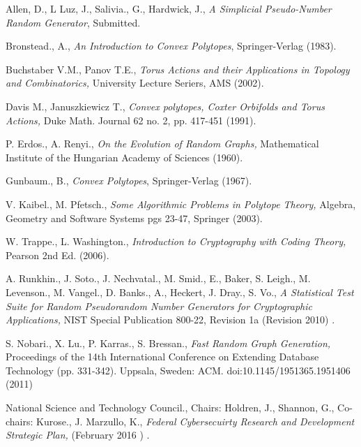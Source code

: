 \documentclass[oneside,12pt]{amsart}
\theoremstyle{definition}
\numberwithin{equation}{section}
\begin{document}
\clearpage
\begin{thebibliography}{14}


 Allen, D., L Luz, J., Salivia., G., Hardwick, J.,
{\emph{A Simplicial Pseudo-Number Random Generator}},
Submitted.


 Bronstead., A.,
{\emph{An Introduction to Convex Polytopes}},
Springer-Verlag (1983).


 Buchstaber V.M., Panov T.E.,
 {\textit{Torus Actions and their Applications in Topology and Combinatorics,}}
 University Lecture Seriers, AMS (2002).



 Davis M., Januszkiewicz T.,
{\em{Convex polytopes, Coxter Orbifolds and Torus Actions,}} Duke
Math. Journal 62 no. 2, pp. 417-451 (1991).


 P. Erdos., A. Renyi.,
 {\textit{On the Evolution of Random Graphs,}}
 Mathematical Institute of the Hungarian Academy of Sciences (1960).

 Gunbaum., B.,
{\emph{Convex Polytopes}},
Springer-Verlag (1967).

 V. Kaibel., M. Pfetsch.,
 {\textit{Some Algorithmic Problems in Polytope Theory,}}
 Algebra, Geometry and Software Systems pgs 23-47, Springer (2003).



 W. Trappe., L. Washington.,
 {\textit{Introduction to Cryptography with Coding Theory,}}
 Pearson 2nd Ed. (2006).






 A. Runkhin., J. Soto., J. Nechvatal., M. Smid., E., Baker, S. Leigh., M. Levenson., M. Vangel.,
D. Banks., A., Heckert, J. Dray., S. Vo.,
 {\textit{A Statistical Test Suite for Random Pseudorandom Number Generators for Cryptographic Applications,}}
 NIST Special Publication 800-22, Revision 1a (Revision 2010) .

 S. Nobari., X. Lu., P. Karras., S. Bressan.,
{\textit{Fast Random Graph Generation,}} Proceedings of the 14th International Conference on Extending Database
Technology (pp. 331-342). Uppsala, Sweden: ACM. doi:10.1145/1951365.1951406  (2011)





 National Science and Technology Council., Chairs:  Holdren, J., Shannon, G., Co-chairs: Kurose., J. Marzullo, K.,
 {\textit{Federal Cybersecuirty Research and Development Strategic Plan,}}
(February 2016 ) .




\end{thebibliography}
\end{document}
